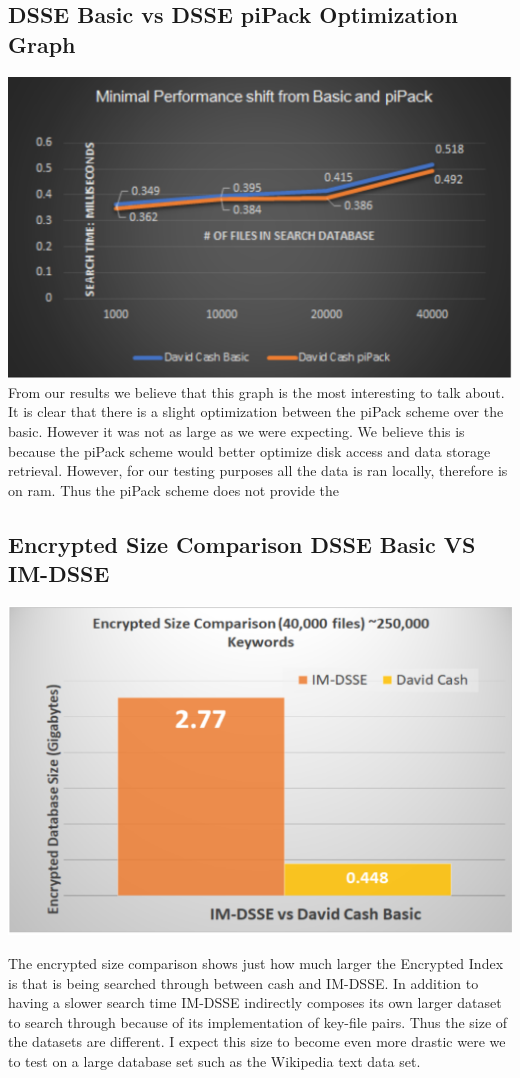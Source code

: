 \subsection{DSSE Basic vs DSSE piPack Optimization Graph}
\includegraphics[width=1\textwidth]{Charts/Basic_Vs_piPack.eps}
From our results we believe that this graph is the most interesting to talk about. It is clear that there is a slight optimization between the piPack scheme over the basic. However it was not as large as we were expecting. We believe this is because the piPack scheme would better optimize disk access and data storage retrieval. However, for our testing purposes all the data is ran locally, therefore is on ram. Thus the piPack scheme does not provide the 
\subsection{Encrypted Size Comparison DSSE Basic VS IM-DSSE}
\includegraphics[width=.8\textwidth]{Charts/encrypt.eps}

The encrypted size comparison shows just how much larger the Encrypted Index is that is being searched through between cash and IM-DSSE. In addition to having a slower search time IM-DSSE indirectly composes its own larger dataset to search through because of its implementation of key-file pairs. Thus the size of the datasets are different. I expect this size to become even more drastic were we to test on a large database set such as the Wikipedia text data set.

